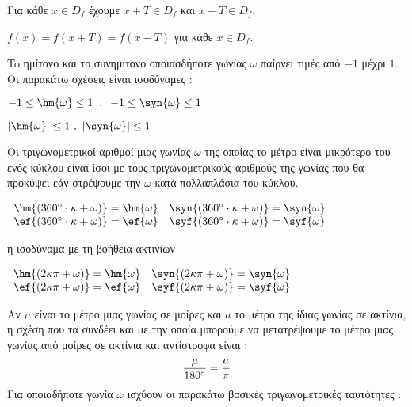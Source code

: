 \documentclass[twoside,nofonts,internet,shmeiwseis]{thewria}
\begin{document}
\begin{rlist}
\item Για κάθε $ x\in D_f $ έχουμε $ x+T\in D_f $ και $ x-T\in D_f $.
\item $ f(x)=f(x+T)=f(x-T) $ για κάθε $ x\in D_f $.
\end{rlist}
\thewrhmata
{}
To ημίτονο και το συνημίτονο οποιασδήποτε γωνίας $ \omega $ παίρνει τιμές από $-1$ μέχρι $ 1 $. Οι παρακάτω σχέσεις είναι ισοδύναμες :
\begin{multicols}{2}
\begin{rlist}
\item  $ -1\leq\hm{\omega}\leq1\;\;,\;\;-1\leq\syn{\omega}\leq1 $
\item $ |\hm{\omega}|\leq1\ ,\ |\syn{\omega}|\leq1 $
\end{rlist}
\end{multicols}
Οι τριγωνομετρικοί αριθμοί μιας γωνίας $ \omega $ της οποίας το μέτρο είναι μικρότερο του ενός κύκλου είναι ίσοι με τους τριγωνομετρικούς αριθμούς της γωνίας που θα προκύψει εάν στρέψουμε την $ \omega $ κατά πολλαπλάσια του κύκλου.
 \begin{center}
$ \begin{array}{cc}
\hm{\left( 360\degree\cdot \kappa+\omega\right) }=\hm{\omega} & \syn{\left( 360\degree\cdot \kappa+\omega\right) }=\syn{\omega} \\ 
\ef{\left( 360\degree\cdot \kappa+\omega\right) }=\ef{\omega} & \syf{\left( 360\degree\cdot \kappa+\omega\right) }=\syf{\omega}
\end{array} $
\end{center}
ή ισοδύναμα με τη βοήθεια ακτινίων
\begin{center}
$ \begin{array}{cc}
\hm{\left( 2\kappa\pi+\omega\right) }=\hm{\omega} & \syn{\left( 2\kappa\pi+\omega\right) }=\syn{\omega} \\ 
\ef{\left( 2\kappa\pi+\omega\right) }=\ef{\omega} & \syf{\left( 2\kappa\pi+\omega\right) }=\syf{\omega}
\end{array} $
\end{center}
Αν $ \mu $ είναι το μέτρο μιας γωνίας σε μοίρες και $ a $ το μέτρο της ίδιας γωνίας σε ακτίνια, η σχέση που τα συνδέει και με την οποία μπορούμε να μετατρέψουμε το μέτρο μιας γωνίας από μοίρες σε ακτίνια και αντίστροφα είναι :
\[ \frac{\mu}{180\degree}=\frac{a}{\pi} \]
Για οποιαδήποτε γωνία $ \omega $ ισχύουν οι παρακάτω βασικές τριγωνομετρικές ταυτότητες :
\end{document}
